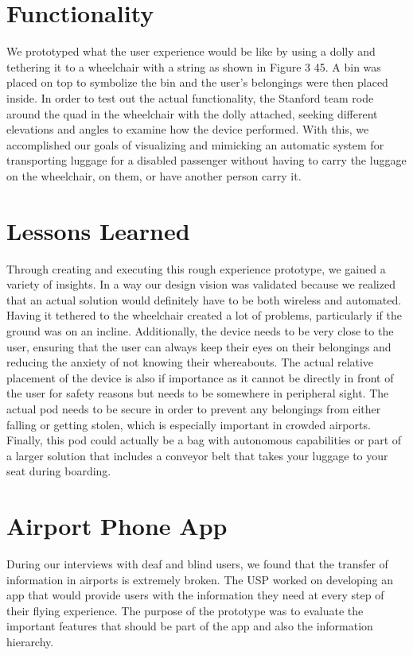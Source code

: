 \documentclass[a4paper, 12pt,conference]{new_cit_thesis}
\begin{document}
\section*{Functionality}
We prototyped what the user experience would be like by using a dolly and tethering it to a wheelchair with a string as shown in Figure 3 45. A bin was placed on top to symbolize the bin and the user’s belongings were then placed inside. In order to test out the actual functionality, the Stanford team rode around the quad in the wheelchair with the dolly attached, seeking different elevations and angles to examine how the device performed. With this, we accomplished our goals of visualizing and mimicking an automatic system for transporting luggage for a disabled passenger without having to carry the luggage on the wheelchair, on them, or have another person carry it. 

\section*{Lessons Learned}
Through creating and executing this rough experience prototype, we gained a variety of insights.  In a way our design vision was validated because we realized that an actual solution would definitely have to be both wireless and automated. Having it tethered to the wheelchair created a lot of problems, particularly if the ground was on an incline. Additionally, the device needs to be very close to the user, ensuring that the user can always keep their eyes on their belongings and reducing the anxiety of not knowing their whereabouts. The actual relative placement of the device is also if importance as it cannot be directly in front of the user for safety reasons but needs to be somewhere in peripheral sight. The actual pod needs to be secure in order to prevent any belongings from either falling or getting stolen, which is especially important in crowded airports. Finally, this pod could actually be a bag with autonomous capabilities or part of a larger solution that includes a conveyor belt that takes your luggage to your seat during boarding.  

\section{Airport Phone App}
During our interviews with deaf and blind users, we found that the transfer of information in airports is extremely broken. The USP worked on developing an app that would provide users with the information they need at every step of their flying experience. The purpose of the prototype was to evaluate the important features that should be part of the app and also the information hierarchy.
\end{document}
